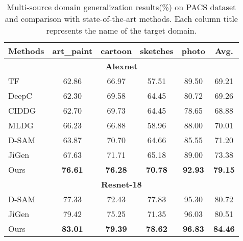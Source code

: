 \documentclass[10pt,twocolumn,letterpaper]{article}
\begin{document}
\begin{table}[t!]
	\begin{center}
		\tabcolsep=0.15cm
		\begin{tabular}{l|c c c c|c}
			\hline
			\hline
			Methods&art\_paint&cartoon&sketches&photo&Avg.\\
			\hline
			\multicolumn{6}{c}{\textbf{Alexnet}}\\
			\hline
			TF\cite{li2017deeper}&62.86&66.97&57.51&89.50&69.21\\
			DeepC\cite{li2018deep}&62.30&69.58&64.45&80.72&69.26\\
			CIDDG\cite{li2018deep}&62.70&69.73&64.45&78.65&68.88\\
			MLDG\cite{li2018learning}&66.23&66.88&58.96&88.00&70.01\\
			D-SAM\cite{d2018domain}&63.87&70.70&64.66&85.55&71.20\\
			JiGen\cite{carlucci2019domain}&67.63&71.71&65.18&89.00&73.38\\
			Ours&\textbf{76.61}&\textbf{76.28}&\textbf{70.78}&\textbf{92.93}&\textbf{79.15}\\
			\hline
			\multicolumn{6}{c}{\textbf{Resnet-18}}\\
			\hline
			D-SAM\cite{d2018domain}&77.33&72.43&77.83&95.30&80.72\\
			JiGen\cite{carlucci2019domain}&79.42&75.25&71.35&96.03&80.51\\
			Ours&\textbf{83.01}&\textbf{79.39}&\textbf{78.62}&\textbf{96.83}&\textbf{84.46}\\
			\hline\hline
		\end{tabular}
	\end{center}
	\caption{Multi-source domain generalization results(\%) on PACS dataset\cite{li2017deeper} and comparison with state-of-the-art methods. Each column title represents the name of the target domain.}
	\label{table1}
\end{table}
\end{document}
